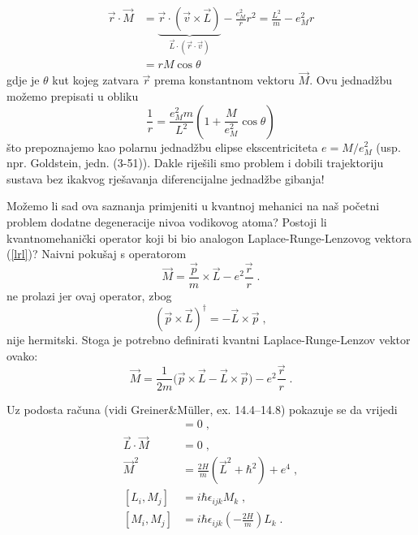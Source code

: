\begin{equation}
\begin{split}
 \vec{r}\cdot\vec{M} &= \underbrace{\vec{r}\cdot(\vec{v}\times\vec{L})}_{
\vec{L}\cdot(\vec{r}\cdot\vec{v})} - \frac{e_{M}^2}{r} r^2
= \frac{L^2}{m} - e_{M}^2 r \\
&= r M \cos \theta
\end{split}
\end{equation}
gdje je $\theta$ kut kojeg zatvara $\vec{r}$ prema konstantnom vektoru
$\vec{M}$. Ovu jednadžbu možemo prepisati u obliku
\begin{equation}
\frac{1}{r} = \frac{e_{M}^2 m}{L^2} \left(1+\frac{M}{e_{M}^2} \cos\theta\right)
\end{equation}
što prepoznajemo kao polarnu jednadžbu elipse ekscentriciteta $e=M/e_{M}^2$
(usp. npr. Goldstein, jedn. (3-51)). Dakle riješili smo problem i
dobili trajektoriju sustava bez ikakvog rješavanja diferencijalne
jednadžbe gibanja!

Možemo li sad ova saznanja primjeniti u kvantnoj mehanici na naš
početni problem dodatne degeneracije nivoa vodikovog atoma?
Postoji li kvantnomehanički operator koji bi bio analogon 
Laplace-Runge-Lenzovog vektora (\ref{lrl})? Naivni pokušaj
s operatorom
\begin{equation}
  \vec{M} = \frac{\vec{p}}{m}\times\vec{L} - e^2\frac{\vec{r}}{r} \;.
\end{equation}
ne prolazi jer ovaj operator, zbog 
\begin{displaymath}
    (\vec{p}\times\vec{L})^\dagger = - \vec{L}\times\vec{p} \;,
\end{displaymath}
nije hermitski. Stoga je potrebno definirati kvantni
Laplace-Runge-Lenzov vektor ovako:
\begin{equation}
  \vec{M} = \frac{1}{2m}\big(\vec{p}\times\vec{L}- \vec{L}\times\vec{p}\big) 
- e^2\frac{\vec{r}}{r} \;.
\end{equation}

Uz podosta računa (vidi Greiner\&M\"{u}ller, ex. 14.4--14.8) 
pokazuje se da vrijedi
\begin{align}
 [\vec{M}, H] &= 0 \;, \tag{A} \\
 \vec{L}\cdot\vec{M} &= 0 \;, \tag{B} \\
\vec{M}^2 &= \frac{2 H}{m}(\vec{L}^2 + \hbar^2) + e^4  \;, \tag{C} \\
 [L_i, M_j] &= i\hbar \epsilon_{ijk} M_k \;, \tag{D} \\
[M_i, M_j] &= i \hbar \epsilon_{ijk} \left(- \frac{2H}{m}\right) L_k \tag{E} \;.
\end{align}

